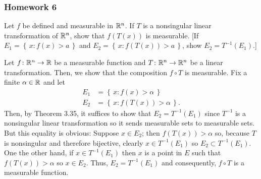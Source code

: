 \subsubsection{Homework 6}
\setcounter{exercise}{0}
\setcounter{equation}{0}

\begin{problem}
  Let $f$ be defined and measurable in $\mathbb{R}^n$. If $T$ is a nonsingular
  linear transformation of $\mathbb{R}^n$, show that $f(T(x))$ is measurable. [If
  $E_1=\left\{\,x: f(x)>a\,\right\}$ and
  $E_2=\left\{\,x:f(T(x))>a\,\right\}$, show $E_2=T^{-1}(E_1)$.]
\end{problem}
\begin{solution}
  Let $f\colon\mathbb{R}^n\to\mathbb{R}$ be a measurable function and
  $T\colon\mathbb{R}^n\to\mathbb{R}^n$ be a linear transformation. Then, we show that
  the composition $f\circ T$ is measurable. Fix a finite $\alpha\in\mathbb{R}$
  and let
  \begin{align*}
    E_1&=\left\{\,x:f(x)>\alpha\,\right\}\\
    E_2&=\left\{\,x:f(T(x))>\alpha\,\right\}.
  \end{align*}
  Then, by Theorem 3.35, it suffices to show that $E_2=T^{-1}(E_1)$ since
  $T^{-1}$ is a nonsingular linear transformation so it sends measurable
  sets to measurable sets. But this equality is obvious: Suppose
  $x\in E_2$; then $f(T(x))>\alpha$ so, because $T$ is nonsingular and
  therefore bijective, clearly $x\in T^{-1}(E_1)$ so $E_2\subset
  T^{-1}(E_1)$. One the other hand, if $x\in T^{-1}(E_1)$ then $x$ is a
  point in $E$ such that $f(T(x))>\alpha$ so $x\in E_2$. Thus,
  $E_2=T^{-1}(E_1)$ and consequently, $f\circ T$ is a measurable function.
\end{solution}

